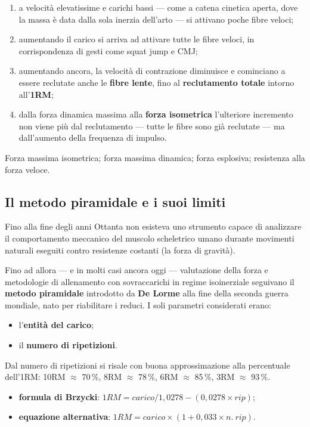 \begin{enumerate}
  \item a velocità elevatissime e carichi bassi --- come a catena cinetica aperta, dove la
    massa è data dalla sola inerzia dell'arto --- si attivano poche fibre veloci;
  \item aumentando il carico si arriva ad attivare tutte le fibre veloci, in corrispondenza
    di gesti come squat jump e CMJ;
  \item aumentando ancora, la velocità di contrazione diminuisce e cominciano a essere reclutate
    anche le \textbf{fibre lente}, fino al \textbf{reclutamento totale} intorno all'\textbf{1RM};
  \item dalla forza dinamica massima alla \textbf{forza isometrica} l'ulteriore incremento non viene
    più dal reclutamento --- tutte le fibre sono già reclutate --- ma dall'aumento della
    frequenza di impulso.
\end{enumerate}

Forza massima isometrica; forza massima dinamica; forza esplosiva; resistenza alla forza veloce.

\subsection{Il metodo piramidale e i suoi limiti}

Fino alla fine degli anni Ottanta non esisteva uno strumento capace di analizzare il comportamento
  meccanico del muscolo scheletrico umano durante movimenti naturali eseguiti contro resistenze
  costanti (la forza di gravità).

Fino ad allora --- e in molti casi ancora oggi --- valutazione della forza e metodologie di
allenamento con sovraccarichi in regime isoinerziale seguivano il \textbf{metodo piramidale}
introdotto da \textbf{De Lorme} alla fine della seconda guerra mondiale, nato per riabilitare i
reduci. I soli parametri considerati erano:
\begin{itemize}
  \item l'\textbf{entità del carico};
  \item il \textbf{numero di ripetizioni}.
\end{itemize}

Dal numero di ripetizioni si risale con buona approssimazione alla percentuale dell'1RM: 10RM
  $\approx$ 70\,\%, 8RM $\approx$ 78\,\%, 6RM $\approx$ 85\,\%, 3RM $\approx$ 93\,\%.
\begin{itemize}
  \item \textbf{formula di Brzycki}: $1RM = carico / 1{,}0278 - (0{,}0278 \times rip)$;
  \item \textbf{equazione alternativa}: $1RM = carico \times (1 + 0{,}033 \times n.\ rip)$.
\end{itemize}

